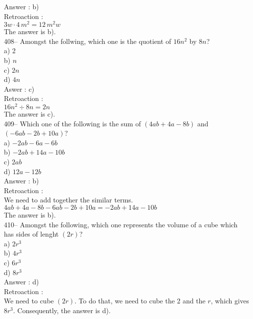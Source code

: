 ﻿\documentclass[letterpaper, 12pt]{article}
\begin{document}
Answer : b)\\

Retroaction : \\
$3w\cdot 4\,m^{2}=12\,m^{2}w$\\
The answer is b).\\

408-- Amongst the follwing, which one is the quotient of $16n^{2}$
by $8n$?\\
a) 2\\
b) $n$\\
c) $2n$\\
d) $4n$\\

Aswer : c)\\

Retroaction : \\
$16n^{2}\div8n=2n$\\
The answer is c).\\

409-- Which one of the following is the sum of
$\left(4ab+4a-8b\right) $ and $\left(-6ab-2b+10a\right)$?\\
a) $-2ab-6a-6b$\\
b) $-2ab+14a-10b$\\
c) $2ab$\\
d) $12a-12b$\\

Answer : b)\\

Retroaction : \\
We need to add together the similar terms.\\
$4ab+4a-8b-6ab-2b+10a=-2ab+14a-10b$\\
The answer is b).\\

410-- Amongst the following, which one represents the volume of a cube which has sides of lenght $\left( 2r\right)$?\\
a) $2r^{3}$\\
b) $4r^{3}$ \\
c) $6r^{3}$\\
d) $8r^{3}$\\

Answer : d)\\

Retroaction : \\
We need to cube $\left( 2r\right)$. To do that, we need to cube the 2 and the $r$, which gives $8r^{3}$. Consequently, the answer is d).\\
\end{document}
